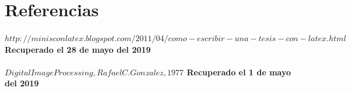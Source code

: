 \documentclass[10pt,a4paper]{article}
\begin{document}
\section{Referencias}
\paragraph{$http://minisconlatex.blogspot.com/2011/04/como-escribir-una-tesis-con-latex.html$ Recuperado el 28 de mayo del 2019}
\paragraph{$Digital Image Processing, Rafael C. Gonzalez,1977$ Recuperado el 1 de mayo del 2019}
\end{document}
